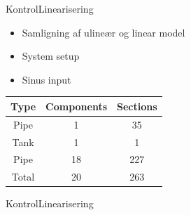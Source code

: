 \begin{frame}{Kontrol}{Linearisering}
   \vfill\vfill\centering
    \begin{minipage}[t]{0.48\linewidth}
\begin{itemize}
		\item Samligning af ulineær og linear model
		\item System setup
	   	\item Sinus input
\end{itemize}    
\end{minipage}\hfill
\begin{minipage}[t]{0.48\linewidth}
\begin{table}[H]
\centering
\begin{tabular}{|c|c|c|}
\hline
	\rowcolor[HTML]{9B9B9B} 
Type  & Components & Sections \\ \hline
Pipe  & 1         & 35       \\ \hline
Tank  & 1         & 1        \\ \hline
Pipe  & 18        & 227      \\ \hline
Total & 20        & 263      \\ \hline
\end{tabular}
\label{tab:system_setup_nonlinear_linear_test}
\end{table}

\end{minipage}
\vfill\vfill

\end{frame}

\begin{frame}{Kontrol}{Linearisering}
\vfill \vfill \centering
% 

\begin{figure}
\centering

\label{fig:linear_nonlinear_comparison__pipe_after_tank}
\end{figure}

    
\begin{figure}
\centering

\label{fig:linear_nonlinear_comparison_last_pipe}
\end{figure}
\vspace{5mm}
\vfill \vfill
\end{frame}


